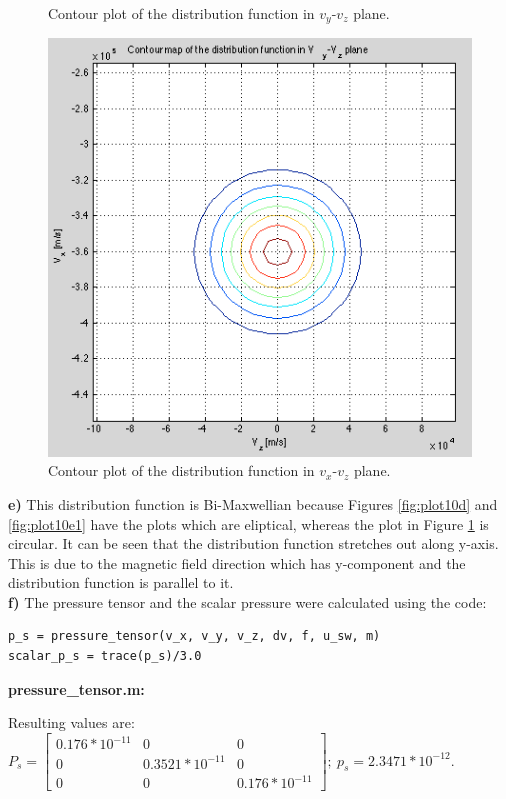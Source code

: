 \documentclass{article}
\begin{document}
\begin{figure}[h!tb]
\begin{minipage}[b]{0.33\linewidth}
\caption{Contour plot of the distribution function in $v_y$-$v_z$ plane.}
\label{fig:plot10e1}
\end{minipage}
\begin{minipage}[b]{0.33\linewidth}
\centering
\includegraphics[width=\textwidth]{Figures/plot_10e2.png}
\caption{Contour plot of the distribution function in $v_x$-$v_z$ plane.}
\label{fig:plot10e2}
\end{minipage}
\end{figure}

\textbf{e)} This distribution function is Bi-Maxwellian because Figures \ref{fig:plot10d} and \ref{fig:plot10e1} have the plots which are eliptical, whereas the plot in Figure \ref{fig:plot10e2} is circular. It can be seen that the distribution function stretches out along y-axis. This is due to the magnetic field direction which has y-component and the distribution function is parallel to it.\\
\textbf{f)} The pressure tensor and the scalar pressure were calculated using the code:
\begin{lstlisting}
p_s = pressure_tensor(v_x, v_y, v_z, dv, f, u_sw, m)
scalar_p_s = trace(p_s)/3.0
\end{lstlisting}
\textbf{pressure\_tensor.m:}

Resulting values are: $P_s=\begin{bmatrix} 0.176*10^{-11} & 0 & 0 \\ 0 & 0.3521*10^{-11} & 0 \\ 0 & 0 & 0.176*10^{-11} \end{bmatrix};\:p_s = 2.3471*10^{-12}$.\\
\end{document}
